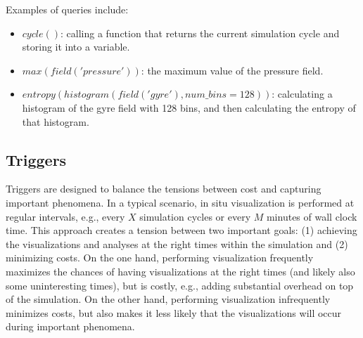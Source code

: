Examples of queries include:
\begin{itemize}
\item $cycle()$: calling a function that returns the current simulation cycle and storing it into a variable.
\item $max(field('pressure'))$: the maximum value of the pressure field.
\item $entropy(histogram(field('gyre'), num\_bins=128))$: calculating a histogram of the gyre field with 128 bins, and then calculating the entropy of that histogram.
\end{itemize}
%

%
%

\subsection{Triggers}
\label{sec:ascent:triggers}

Triggers are designed to balance the tensions between cost and capturing important phenomena.
%
In a typical scenario, in situ visualization is performed at regular intervals, e.g.,
every $X$ simulation cycles or every $M$ minutes of wall clock time.
%
This approach creates a tension between two important goals:
(1) achieving the visualizations and analyses at the right times within the simulation
and (2) minimizing costs.
%
On the one hand, performing visualization frequently maximizes the chances of having
visualizations at the right times (and likely also some uninteresting times), but
is costly,  e.g., adding substantial overhead on top of the simulation.
%
On the other hand, performing visualization infrequently minimizes costs, but also makes it
less likely that the visualizations will occur during important phenomena.
%

